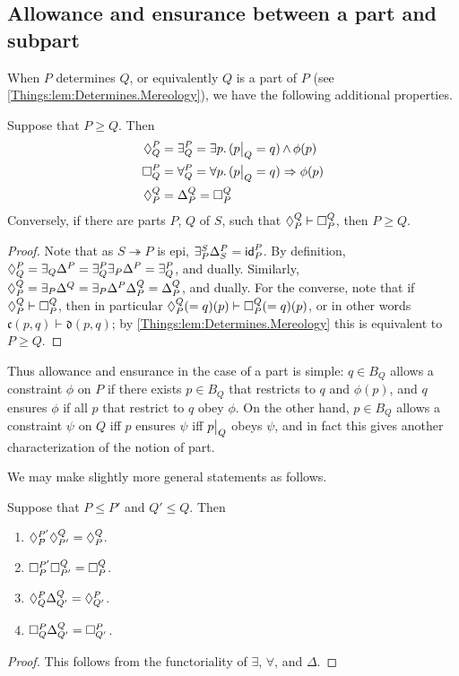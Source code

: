 \subsection{Allowance and ensurance between a part and subpart}
When $P$ determines $Q$, or equivalently $Q$ is a part of $P$ (see \cref{Things:lem:Determines.Mereology}), we have the following additional properties.
\begin{prop} \label{Things:prop:parts}
Suppose that $P \geq Q$. Then
\begin{align*}
    \allows{P}{Q} &= \exists^P_Q = \exists p.\, (\rest{p}{Q} = q) \meet \phi(p) \\
    \ensure{P}{Q} &= \forall^P_Q = \forall p.\, (\rest{p}{Q} = q) \Rightarrow \phi(p) \\
    \allows{Q}{P} &= \Delta^Q_P = \ensure{Q}{P}
\end{align*}
Conversely, if there are parts $P$, $Q$ of $S$, such that $\allows{Q}{P} \vdash \ensure{Q}{P}$, then $P \geq Q$.
\end{prop}
\begin{proof}
Note that as $S \twoheadrightarrow P$ is epi, $\exists^S_P\Delta^P_S = \id^P_P$. By definition, $\allows{P}{Q} = \exists_Q \Delta^P = \exists^P_Q \exists_P \Delta^P = \exists^P_Q$, and dually. Similarly, $\allows{Q}{P} = \exists_P\Delta^Q = \exists_P \Delta^P \Delta^Q_P = \Delta^Q_P$, and dually. For the converse, note that if $\allows{Q}{P} \vdash \ensure{Q}{P}$, then in particular $\allows{Q}{P}(=q)(p) \vdash \ensure{Q}{P}(=q)(p)$, or in other words $\mathfrak{c}(p, q) \vdash \mathfrak{d}(p, q)$; by  \cref{Things:lem:Determines.Mereology} this is equivalent to $P \geq Q$.
\end{proof}

Thus allowance and ensurance in the case of a part is simple: $q \in B_Q$ allows a constraint $\phi$ on $P$ if there exists $p \in B_Q$ that restricts to $q$ and $\phi(p)$, and $q$ ensures $\phi$ if all $p$ that restrict to $q$ obey $\phi$. On the other hand, $p \in B_Q$ allows a constraint $\psi$ on $Q$ iff $p$ ensures $\psi$ iff $\rest{p}{Q}$ obeys $\psi$, and in fact this gives another characterization of the notion of part.

We may make slightly more general statements as follows.
\begin{prop}\label{Things:prop:parts.operations}
Suppose that $P \leq P'$ and $Q' \leq Q$. Then
\begin{enumerate}
    \item $\allows{P'}{P} \allows{Q}{P'} = \allows{Q}{P}$.
    \item $\ensure{P'}{P} \ensure{Q}{P'} = \ensure{Q}{P}$.
    \item $\allows{P}{Q} \Delta^{Q}_{Q'} = \allows{P}{Q'}$.
    \item $\ensure{P}{Q} \Delta^{Q}_{Q'} = \ensure{P}{Q'}$.
\end{enumerate}
\end{prop}
\begin{proof}
This follows from the functoriality of $\exists$, $\forall$, and $\Delta$.
\end{proof}

